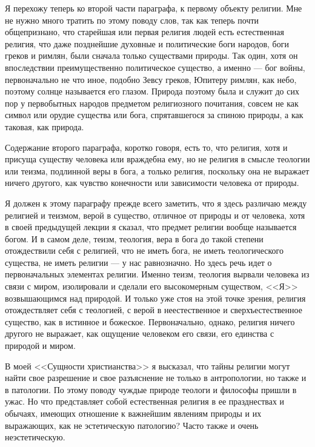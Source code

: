 \documentclass[12pt]{article}
\begin{document}
Я перехожу теперь ко второй части параграфа, к первому объекту религии. Мне не нужно много тратить по этому поводу слов, так как теперь почти общепризнано, что старейшая или первая религия людей есть естественная религия, что даже позднейшие духовные и политические боги народов, боги греков и римлян, были сначала только существами природы. Так один, хотя он впоследствии преимущественно политическое существо, а именно --- бог войны, первоначально не что иное, подобно Зевсу греков, Юпитеру римлян, как небо, поэтому солнце называется его глазом. Природа поэтому была и служит до сих пор у первобытных народов предметом религиозного почитания, совсем не как символ или орудие существа или бога, спрятавшегося за спиною природы, а как таковая, как природа. 

Содержание второго параграфа, коротко говоря, есть то, что религия, хотя и присуща существу человека или враждебна ему, но не религия в смысле теологии или теизма, подлинной веры в бога, а только религия, поскольку она не выражает ничего другого, как чувство конечности или зависимости человека от природы. 

Я должен к этому параграфу прежде всего заметить, что я здесь различаю между религией и теизмом, верой в существо, отличное от природы и от человека, хотя в своей предыдущей лекции я сказал, что предмет религии вообще называется богом. И в самом деле, теизм, теология, вера в бога до такой степени отождествили себя с религией, что не иметь бога, не иметь теологического существа, не иметь религии --- у нас равнозначно. Но здесь речь идет о первоначальных элементах религии. Именно теизм, теология вырвали человека из связи с миром, изолировали и сделали его высокомерным существом, <<Я>>  возвышающимся над природой. И только уже стоя на этой точке зрения, религия отождествляет себя с теологией, с верой в неестественное и сверхъестественное существо, как в истинное и божеское. Первоначально, однако, религия ничего другого не выражает, как ощущение человеком его связи, его единства с природой и миром. 

В моей <<Сущности христианства>> я высказал, что тайны религии могут найти свое разрешение и свое разъяснение не только в антропологии, но также и в патологии. По этому поводу чуждые природе теологи и философы пришли в ужас. Но что представляет собой естественная религия в ее празднествах и обычаях, имеющих отношение к важнейшим явлениям природы и их выражающих, как не эстетическую патологию? Часто также и очень неэстетическую. 
\end{document}
